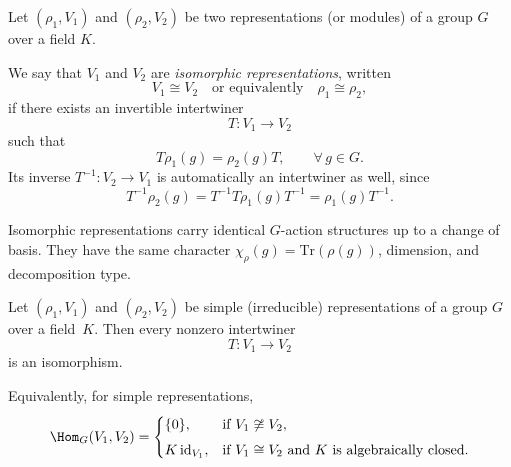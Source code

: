 \begin{definition}\label{def:isomorphism-representations}
Let $(\rho_1,V_1)$ and $(\rho_2,V_2)$ be two representations (or modules) of a group $G$ over a field $K$.

We say that $V_1$ and $V_2$ are \emph{isomorphic representations}, written
\[
V_1 \cong V_2 \quad\text{or equivalently}\quad \rho_1 \cong \rho_2,
\]
if there exists an invertible intertwiner
\[
T:V_1 \longrightarrow V_2
\]
such that
\[
T\rho_1(g) = \rho_2(g)T, \qquad \forall\, g\in G.
\]
Its inverse $T^{-1}:V_2\to V_1$ is automatically an intertwiner as well, since
\[
T^{-1}\rho_2(g)
  = T^{-1}T\rho_1(g)T^{-1}
  = \rho_1(g)T^{-1}.
\]
\end{definition}

\begin{remark}
Isomorphic representations carry identical $G$-action structures up to a change of basis.
They have the same character $\chi_\rho(g)=\mathrm{Tr}(\rho(g))$, dimension, and decomposition type.
\end{remark}

\begin{theorem}\label{thm:schur-II}
Let $(\rho_1,V_1)$ and $(\rho_2,V_2)$ be simple (irreducible) representations of a group $G$ over a field~$K$.
Then every nonzero intertwiner
\[
T:V_1 \longrightarrow V_2
\]
is an isomorphism.

Equivalently, for simple representations,
\[
\Hom_G(V_1,V_2) =
\begin{cases}
\{0\}, & \text{if } V_1\not\cong V_2,\\[4pt]
K\,\mathrm{id}_{V_1}, & \text{if } V_1\cong V_2\text{ and $K$ is algebraically closed.}
\end{cases}
\]
\end{theorem}

